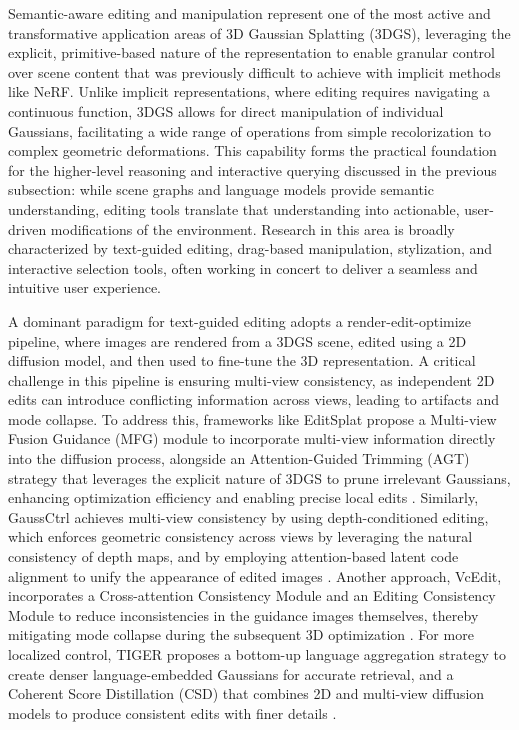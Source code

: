 \documentclass[11pt]{article}
\begin{document}
Semantic-aware editing and manipulation represent one of the most active and transformative application areas of 3D Gaussian Splatting (3DGS), leveraging the explicit, primitive-based nature of the representation to enable granular control over scene content that was previously difficult to achieve with implicit methods like NeRF. Unlike implicit representations, where editing requires navigating a continuous function, 3DGS allows for direct manipulation of individual Gaussians, facilitating a wide range of operations from simple recolorization to complex geometric deformations. This capability forms the practical foundation for the higher-level reasoning and interactive querying discussed in the previous subsection: while scene graphs and language models provide semantic understanding, editing tools translate that understanding into actionable, user-driven modifications of the environment. Research in this area is broadly characterized by text-guided editing, drag-based manipulation, stylization, and interactive selection tools, often working in concert to deliver a seamless and intuitive user experience.

A dominant paradigm for text-guided editing adopts a render-edit-optimize pipeline, where images are rendered from a 3DGS scene, edited using a 2D diffusion model, and then used to fine-tune the 3D representation. A critical challenge in this pipeline is ensuring multi-view consistency, as independent 2D edits can introduce conflicting information across views, leading to artifacts and mode collapse. To address this, frameworks like EditSplat propose a Multi-view Fusion Guidance (MFG) module to incorporate multi-view information directly into the diffusion process, alongside an Attention-Guided Trimming (AGT) strategy that leverages the explicit nature of 3DGS to prune irrelevant Gaussians, enhancing optimization efficiency and enabling precise local edits \cite{ref538}. Similarly, GaussCtrl achieves multi-view consistency by using depth-conditioned editing, which enforces geometric consistency across views by leveraging the natural consistency of depth maps, and by employing attention-based latent code alignment to unify the appearance of edited images \cite{ref539}. Another approach, VcEdit, incorporates a Cross-attention Consistency Module and an Editing Consistency Module to reduce inconsistencies in the guidance images themselves, thereby mitigating mode collapse during the subsequent 3D optimization \cite{ref540}. For more localized control, TIGER proposes a bottom-up language aggregation strategy to create denser language-embedded Gaussians for accurate retrieval, and a Coherent Score Distillation (CSD) that combines 2D and multi-view diffusion models to produce consistent edits with finer details \cite{ref541}.
\end{document}
